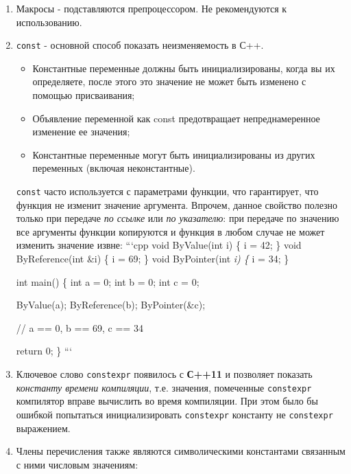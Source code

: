 \begin{enumerate}
\def\labelenumi{\arabic{enumi})}
\item
  Макросы - подставляются препроцессором. Не рекомендуются к
  использованию.

\begin{Shaded}
\begin{Highlighting}[]
\end{Highlighting}
\end{Shaded}
\item
  \texttt{const} - основной способ показать неизменяемость в С++.

  \begin{itemize}
  \tightlist
  \item
    Константные переменные должны быть инициализированы, когда вы их
    определяете, после этого это значение не может быть изменено с
    помощью присваивания;
  \item
    Объявление переменной как const предотвращает непреднамеренное
    изменение ее значения;
  \item
    Константные переменные могут быть инициализированы из других
    переменных (включая неконстантные).
  \end{itemize}

  \texttt{const} часто используется с параметрами функции, что
  гарантирует, что функция не изменит значение аргумента. Впрочем,
  данное свойство полезно только при передаче \emph{по ссылке} или
  \emph{по указателю}: при передаче по значению все аргументы функции
  копируются и функция в любом случае не может изменить значение извне:
  ```cpp void ByValue(int i) \{ i = 42; \} void ByReference(int \&i) \{
  i = 69; \} void ByPointer(int \emph{i) \{ }i = 34; \}

  int main() \{ int a = 0; int b = 0; int c = 0;

  ByValue(a); ByReference(b); ByPointer(\&c);

  // a == 0, b == 69, c == 34

  return 0; \} ```
\item
  Ключевое слово \texttt{constexpr} появилось с \textbf{С++11} и
  позволяет показать \emph{константу времени компиляции}, т.е. значения,
  помеченные \texttt{constexpr} компилятор вправе вычислить во время
  компиляции. При этом было бы ошибкой попытаться инициализировать
  \texttt{constexpr} константу не \texttt{constexpr} выражением.
\item
  Члены перечисления также являются символическими константами связанным
  с ними числовым значениям:


\end{enumerate}

